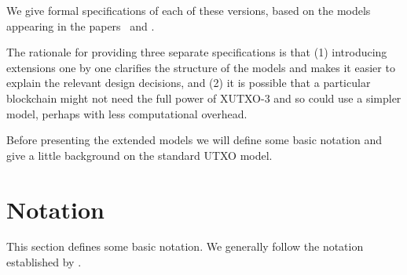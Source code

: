 \documentclass[a4paper]{article}
\theoremstyle{definition}  %
\begin{document}
\noindent We give formal specifications of each of these versions,
based on the models appearing in the
papers~\cite{Zahnentferner18-Chimeric} and
\cite{Zahnentferner18-UTxO}.

\medskip

The rationale for providing three separate specifications is that (1)
introducing extensions one by one clarifies the structure of the
models and makes it easier to explain the relevant design decisions,
and (2) it is possible that a particular blockchain might not need the
full power of XUTXO-3 and so could use a simpler model, perhaps with
less computational overhead.

\bigskip

\noindent Before presenting the extended models we will define some
basic notation and give a little background on the standard UTXO
model.


\section{Notation}
This section defines some basic notation.  We generally follow the
notation established by \cite{Zahnentferner18-UTxO}.
\end{document}
